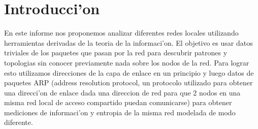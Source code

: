 \section{Introducci'on}
En este informe nos proponemos analizar diferentes redes locales utilizando herramientas derivadas de la
teoria de la informaci'on. El objetivo es usar datos triviales de los paquetes que pasan
por la red para descubrir patrones y topologias sin conocer previamente nada sobre los nodos de la red. Para lograr esto
utilizamos direcciones de la capa de enlace en un principio y luego datos de paquetes ARP (address resolution protocol,
un protocolo  utilizado para obtener una direcci'on de enlace dada una direccion de red para que 2 nodos en 
una misma red local de acceso compartido puedan comunicarse) para obtener mediciones de informaci'on y entropia de la misma
red modelada de modo diferente.

